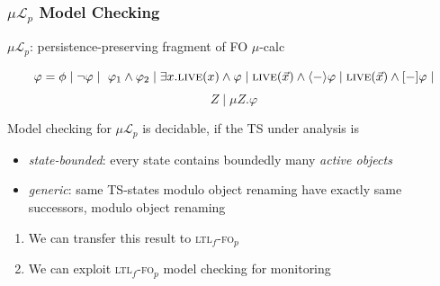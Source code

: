 \documentclass{beamer}
\renewcommand{\L}{\mathcal L\xspace}
\newcommand{\live}{\textsc{live}}
\newcommand{\ltlf}{\textsc{ltl}$_f$\xspace}
\newcommand{\ltlffop}{\ltlf-\textsc{fo}$_p$\xspace}
\newcommand{\muLp}{$\mu\L_p$\xspace}
\newcommand{\DIAM}{\langle-\rangle\xspace}
\newcommand{\BOX}{[-]\xspace}
\begin{document}

\begin{frame}
\frametitle{\muLp Model Checking}

\begin{center}
	\muLp: persistence-preserving fragment of FO $\mu$-calc 
\end{center}
\[\varphi = \phi\mid\lnot\varphi\mid~\varphi_1\land\varphi_2 \mid
     \exists x. \live(x) \land \varphi\mid\live(\vec{x}) \land \DIAM{\varphi} \mid
     \live(\vec{x}) \land \BOX{ \varphi}\mid\]
\[Z\mid\mu Z.\varphi\]


\begin{theorem}[\cite{?}]
	Model checking for  \muLp is decidable, if the TS under analysis is
	\begin{itemize}	
		\item \emph{state-bounded}: every state contains boundedly many \emph{active objects}
		\item \emph{generic}:  same TS-states modulo object renaming have exactly 
			same successors, modulo object renaming 
 	\end{itemize}
\end{theorem}


\begin{enumerate}	
	\item We can transfer this result to \ltlffop
	\item We can exploit \ltlffop model checking for monitoring
\end{enumerate}


\end{frame}

\end{document}
